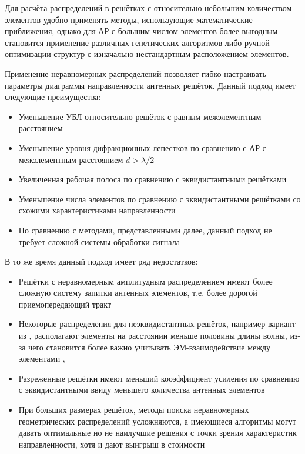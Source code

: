 Для расчёта распределений в решётках с относительно небольшим количеством элементов удобно применять 
методы, использующие математические приближения, однако для АР с большим числом элементов более выгодным 
становится применение различных генетических алгоритмов либо ручной оптимизации структур с 
изначально нестандартным расположением элементов.

Применение неравномерных распределений позволяет гибко настраивать параметры 
диаграммы направленности антенных решёток. Данный подход имеет следующие преимущества:

\begin{itemize}
    \item Уменьшение УБЛ относительно решёток с равным межэлементным расстоянием
    \item Уменьшение уровня дифракционных лепестков по сравнению с АР с межэлементным расстоянием $d>\lambda/2$
    \item Увеличенная рабочая полоса по сравнению с эквидистантными решётками \cite{andreasen1962linear}
    \item Уменьшение числа элементов по сравнению с 
    эквидистантными решётками со схожими характеристиками направленности
    \item По сравнению с методами, представленными далее, данный подход не требует сложной системы обработки сигнала
\end{itemize}

В то же время данный подход имеет ряд недостатков:

\begin{itemize}
    \item Решётки с неравномерным амплитудным распределением имеют более сложную систему 
    запитки антенных элементов, т.е. более дорогой приемопередающий тракт
    \item Некоторые распределения для неэквидистантных решёток, например вариант 
    из \cite{harrington1961sidelobe}, располагают элементы на расстоянии меньше половины длины волны, 
    из-за чего становится более важно учитывать 
    ЭМ-взаимодействие между элементами \cite{andreasen1962linear}, \cite{ishimaru1962theory}
    \item Разреженные решётки имеют меньший кооэффициент усиления по сравнению с 
    эквидистантными \cite{andreasen1962linear} ввиду меньшего количества антенных элементов
    \item При больших размерах решёток, методы поиска неравномерных геометрических распределений усложняются, 
    а имеющиеся алгоритмы могут давать оптимальные но не наилучшие решения с точки зрения 
    характеристик направленности, хотя и дают выигрыш в стоимости
\end{itemize}